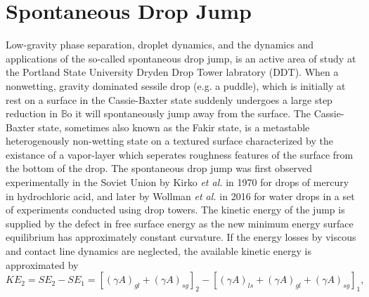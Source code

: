 \documentclass[12pt,a4paper,oneside]{book}
\begin{document}
\section{Spontaneous Drop Jump}
Low-gravity phase separation, droplet dynamics, and the dynamics and applications of the so-called spontaneous drop jump, is an active area of study at the Portland State University Dryden Drop Tower labratory (DDT). When a nonwetting, gravity dominated sessile drop (e.g. a puddle), which is initially at rest on a surface in the Cassie-Baxter state suddenly undergoes a large step reduction in $\mathbb{B}\mbox{o}$ it will spontaneously jump away from the surface. The Cassie-Baxter state, sometimes also known as the Fakir state, is a metastable heterogenously non-wetting state on a textured surface characterized by the existance of a vapor-layer which seperates roughness features of the surface from the bottom of the drop. The spontaneous drop jump was first observed experimentally in the Soviet Union by Kirko \emph{et al.}\cite{kirko_phenomenon_1970} in 1970 for drops of mercury in hydrochloric acid, and later by Wollman \emph{et al.} in 2016 for water drops in a set of experiments conducted using drop towers\cite{wollman_more_2016}. The kinetic energy of the jump is supplied by the defect in free surface energy as the new minimum energy surface equilibrium has approximately constant curvature. If the energy losses by viscous and contact line dynamics are neglected, the available kinetic energy is approximated by
\[KE_2 = SE_2 - SE_1 = [(\gamma A)_{gl} + (\gamma A)_{sg}]_2 - [(\gamma A)_{ls} + (\gamma A)_{gl} + (\gamma A)_{sg}]_1, \]
\end{document}
